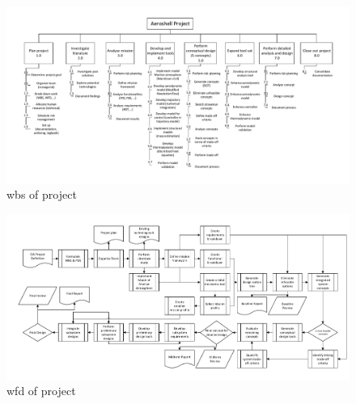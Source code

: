 \begin{figure}
    \includegraphics[scale=0.85]{Figure/WBS_MTR.pdf}
    \caption{\acrfull{wbs} of project}
    \label{fig:wbs}
\end{figure}
\begin{figure}
    \includegraphics[scale=0.85]{Figure/WFD_MTR.pdf}
    \caption{\acrfull{wfd} of project}
    \label{fig:wfd}
\end{figure}